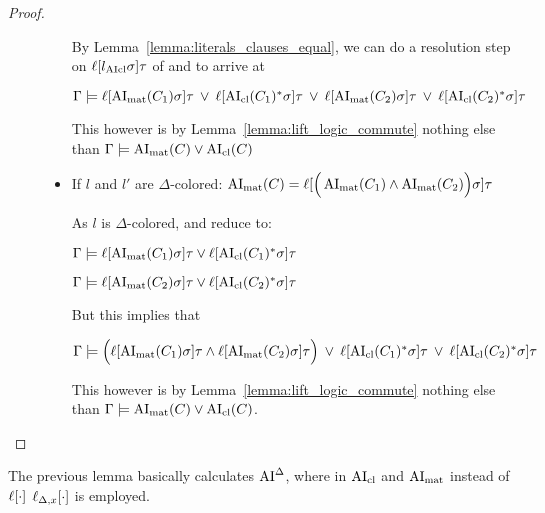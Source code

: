 \documentclass[,%
	paper=a4,%
	DIV12, %
	twoside=false,%
	liststotoc,
	bibtotoc,
	draft=false,%
	numbers=noendperiod
]{scrartcl}
\begin{document}
\begin{proof}
\begin{description}
\begin{itemize}
					By Lemma~\ref{lemma:literals_clauses_equal}, we can do a resolution step on $\ell[l_{\operatorname{AIcl}}\sigma]\tau$ of \markA{} and \markB{} to arrive at 

					$\Gamma \models \ell[\operatorname{AI}_\mathrm{mat}(C_1)\sigma]\tau \;\,{\lor}\;\, \ell[\operatorname{AI}_\mathrm{cl}(C_1)^*\sigma]\tau\;\,{\lor}\;\, 
					\ell[\operatorname{AI}_\mathrm{mat}(C_2)\sigma]\tau\;\,{\lor}\;\, \ell[\operatorname{AI}_\mathrm{cl}(C_2)^*\sigma]\tau $

					This however is by Lemma~\ref{lemma:lift_logic_commute} nothing else than
					$\Gamma \models \operatorname{AI}_\mathrm{mat}(C) \lor \operatorname{AI}_\mathrm{cl}(C)$

				\item If $l$ and $l'$ are $\Delta$-colored:
					$\operatorname{AI}_\mathrm{mat}(C) = \ell[\Big(\operatorname{AI}_\mathrm{mat}(C_1) \land \operatorname{AI}_\mathrm{mat}(C_2)\Big)\sigma] \tau$

					As $l$ is $\Delta$-colored, \markA{} and \markB{} reduce to:

					$\Gamma \models \ell[\operatorname{AI}_\mathrm{mat}(C_1)\sigma]\tau \lor \ell[\operatorname{AI}_\mathrm{cl}(C_1)^*\sigma]\tau$

					$\Gamma \models \ell[\operatorname{AI}_\mathrm{mat}(C_2)\sigma]\tau \lor \ell[\operatorname{AI}_\mathrm{cl}(C_2)^*\sigma]\tau$

					But this implies that 

					$\Gamma \models \Big(\ell[\operatorname{AI}_\mathrm{mat}(C_1)\sigma]\tau \land \ell[\operatorname{AI}_\mathrm{mat}(C_2)\sigma]\tau\Big) 
					\;\,{\lor}\;\, \ell[\operatorname{AI}_\mathrm{cl}(C_1)^*\sigma]\tau
					\;\,{\lor}\;\, \ell[\operatorname{AI}_\mathrm{cl}(C_2)^*\sigma]\tau$

					This however is by Lemma~\ref{lemma:lift_logic_commute} nothing else than 
					$\Gamma \models \operatorname{AI}_\mathrm{mat}(C) \lor \operatorname{AI}_\mathrm{cl}(C)$.
					\qedhere
			\end{itemize}

	\end{description}
\end{proof}

\begin{lemma}
	The previous lemma basically calculates $\operatorname{AI}^\Delta$, where in $\operatorname{AI}_\mathrm{cl}$ and $\operatorname{AI}_\mathrm{mat}$ instead of $\ell[\cdot]$ $\ell_{\Delta,x}[\cdot]$ is employed.
\end{lemma}
\end{document}
